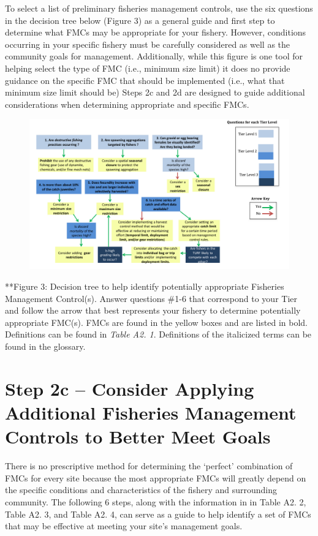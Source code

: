 \documentclass[]{book}
\begin{document}
To select a list of preliminary fisheries management controls, use the
six questions in the decision tree below (Figure 3) as a general guide
and first step to determine what FMCs may be appropriate for your
fishery. However, conditions occurring in your specific fishery must be
carefully considered as well as the community goals for management.
Additionally, while this figure is one tool for helping select the type
of FMC (i.e., minimum size limit) it does no provide guidance on the
specific FMC that should be implemented (i.e., what that minimum size
limit should be) Steps 2c and 2d are designed to guide additional
considerations when determining appropriate and specific FMCs.

\begin{figure}
\centering
\includegraphics{myMediaFolder/media/FMCs.png}
\caption{}
\end{figure}

**Figure 3: Decision tree to help identify potentially appropriate
Fisheries Management Control(s). Answer questions \#1-6 that correspond
to your Tier and follow the arrow that best represents your fishery to
determine potentially appropriate FMC(s). FMCs are found in the yellow
boxes and are listed in bold. Definitions can be found in \emph{Table
A2. 1}. Definitions of the italicized terms can be found in the
glossary.

\section{Step 2c -- Consider Applying Additional Fisheries Management
Controls to Better Meet
Goals}\label{step-2c-consider-applying-additional-fisheries-management-controls-to-better-meet-goals}

There is no prescriptive method for determining the `perfect'
combination of FMCs for every site because the most appropriate FMCs
will greatly depend on the specific conditions and characteristics of
the fishery and surrounding community. The following 6 steps, along with
the information in in Table A2. 2, Table A2. 3, and Table A2. 4, can
serve as a guide to help identify a set of FMCs that may be effective at
meeting your site's management goals.
\end{document}
